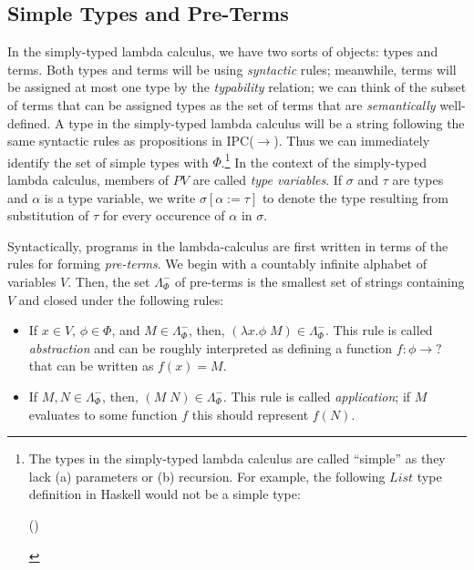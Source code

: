 \documentclass[12pt]{article}
\newcommand{\Conid}[1]{\mathit{#1}}
\newcommand{\Varid}[1]{\mathit{#1}}
\def\resethooks{%
  \global\let\SaveRestoreHook\empty
  \global\let\ColumnHook\empty}
\let\hspre\empty
\let\hspost\empty
\begin{document}
\subsection{Simple Types and Pre-Terms}
In the simply-typed lambda calculus, we have two sorts of objects: types and terms. 
Both types and terms will be using \textit{syntactic} rules; 
meanwhile, terms will be assigned at most one type by the \textit{typability} relation;
we can think of the subset of terms that can be assigned types as the set of terms that are
\textit{semantically} well-defined.  
A type in the simply-typed lambda calculus will be a string following the same syntactic rules as propositions in IPC($\to$). 
Thus we can immediately identify the set of simple types with $\Phi$.\footnote{
The types in the simply-typed lambda calculus are called ``simple'' as they lack (a) parameters or (b) recursion. 
For example, the following \ensuremath{\Conid{List}} type definition in Haskell would not be a simple type: 
\begin{hscode}\SaveRestoreHook
\column{B}{@{}>{\hspre}l<{\hspost}@{}}%
\column{E}{@{}>{\hspre}l<{\hspost}@{}}%
\>[B]{}\Conid{List}\;\Varid{a}\mathrel{=}\Conid{Cons}\;\Varid{a}\;(\Conid{List}\;\Varid{a})\mid \Conid{Empty}{}\<[E]%
\ColumnHook
\end{hscode}\resethooks
} 
In the context of the simply-typed lambda calculus, members of $PV$ are called \textit{type variables}. 
If $\sigma$ and $\tau$ are types and $\alpha$ is a type variable, 
we write $\sigma[\alpha:=\tau]$ to denote the type resulting from substitution of $\tau$
for every occurence of $\alpha$ in $\sigma$. 

Syntactically, programs in the lambda-calculus are first written in terms of the rules for forming \textit{pre-terms}. 
We begin with a countably infinite alphabet of variables $V$. 
Then, the set $\Lambda_\Phi^-$ of pre-terms is the smallest set of strings containing $V$ and closed under the following rules:
\begin{itemize}
\item If $x\in V$, $\phi\in\Phi$, and $M\in \Lambda_\Phi^-$, then, $(\lambda x .\phi \; M)\in \Lambda_\Phi^-$.
This rule is called \textit{abstraction} and can be roughly interpreted as defining a function $f\colon \phi\to \mathord{?}$ 
that can be written as $f(x) = M$. 
\item If $M,N\in \Lambda_\Phi^-$, then, $(M\; N)\in\Lambda_\Phi^-$. 
This rule is called \textit{application}; if $M$ evaluates to some function $f$ this should represent $f(N)$.  
\end{itemize}
\end{document}
